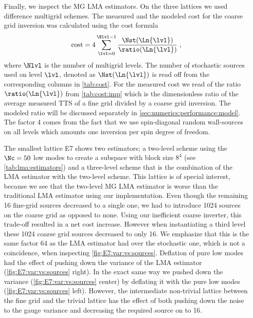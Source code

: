 Finally, we inspect the MG LMA estimators.
On the three lattices we used difference multigrid schemes.
The measured and the modeled cost for the coarse grid inversion was calculated using the cost formula
\begin{equation} \label{eq:numerics:cost}
\text{cost} = 4 \sum_{\lvl = 0}^{\Nlvl -1} \frac{\Nst(\Ln{\lvl})}{\ratio(\Ln{\lvl})} \;,
\end{equation}
where $\Nlvl$ is the number of multigrid levels.
The number of stochastic sources used on level $\lvl$, denoted as $\Nst(\Ln{\lvl})$ is read off from the corresponding columns in \cref{tab:cost}.
For the measured cost we read of the ratio $\ratio(\Ln{\lvl})$ from \cref{tab:cost:imp} which is the dimensionless ratio of the average measured TTS of a fine grid divided by a coarse grid inversion.
The modeled ratio will be discussed separately in \cref{sec:numerics:performance:model}.
The factor \num{4} comes from the fact that we use spin-diagonal random wall-sources on all levels which amounts one inversion per spin degree of freedom.

The smallest lattice E7 shows two estimators; a two-level scheme using the $\Nc=50$ low modes to create a subspace with block size $8^4$ (see \cref{tab:lma:estimators}) and a three-level scheme that is the combination of the LMA estimator with the two-level scheme.
This lattice is of special interest, because we see that the two-level MG LMA estimator is worse than the traditional LMA estimator using our implementation.
Even though the remaining \num{16} fine-grid sources decreased to a single one, we had to introduce \num{1024} sources on the coarse grid as opposed to none.
Using our inefficient coarse inverter, this trade-off resulted in a net cost increase.
However when instantiating a third level these \num{1024} coarse grid sources decreased to only \num{16}.
We emphasize that this is the same factor \num{64} as the LMA estimator had over the stochastic one, which is not a coincidence, when inspecting \cref{fig:E7:var:vs:sources}.
Deflation of pure low modes had the effect of pushing down the  variance of the LMA estimator (\cref{fig:E7:var:vs:sources} right).
In the exact same way we pushed down the  variance (\cref{fig:E7:var:vs:sources} center) by deflating it with the pure low modes (\cref{fig:E7:var:vs:sources} left).
However, the intermediate non-trivial lattice between the fine grid and the trivial lattice has the effect of both pushing down the  noise to the gauge variance and decreasing the required source on  to \num{16}.

